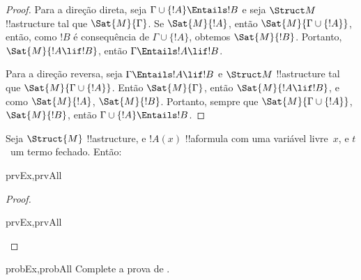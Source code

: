 \documentclass[../../../include/open-logic-section]{subfiles}
\begin{document}
\begin{proof}
Para a direção direta, seja $\Gamma \cup \{ !A \} \Entails !B$ e
seja $\Struct M$ !!a{structure} tal que $\Sat{M}{\Gamma}$. Se
$\Sat{M}{!A}$, então $\Sat{M}{\Gamma \cup \{ !A \} }$, então, como $!B$ é consequência de $\Gamma
\cup \{ !A \}$, obtemos $\Sat{M}{!B}$. Portanto,
$\Sat{M}{!A \lif !B}$, então $\Gamma \Entails !A \lif !B$.

Para a direção reversa, seja $\Gamma \Entails !A \lif !B$ e
$\Struct M$ !!a{structure} tal que $\Sat{M}{\Gamma \cup \{ !A
  \}}$. Então $\Sat{M}{\Gamma}$, então $\Sat{M}{!A \lif !B}$, e como
$\Sat{M}{!A}$, $\Sat{M}{!B}$. Portanto, sempre que $\Sat{M}{\Gamma \cup \{
  !A \} }$, $\Sat{M}{!B}$, então $\Gamma \cup \{ !A \} \Entails !B$.
\end{proof}

\begin{prop}
  Seja $\Struct{M}$ !!a{structure}, e $!A(x)$ !!a{formula} com
  uma variável livre~$x$, e $t$~um termo fechado. Então:
  \begin{tagenumerate}{prvEx,prvAll}
  \end{tagenumerate}
\end{prop}

\begin{proof}
  \begin{tagenumerate}{prvEx,prvAll}
  \end{tagenumerate}
\end{proof}

\begin{probtag}{probEx,probAll}
  Complete a prova de .
\end{probtag} 
\end{document}
